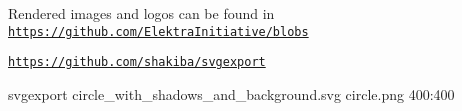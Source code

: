Rendered images and logos can be found in \href{https://github.com/ElektraInitiative/blobs}{\tt https\+://github.\+com/\+Elektra\+Initiative/blobs}

\href{https://github.com/shakiba/svgexport}{\tt https\+://github.\+com/shakiba/svgexport}


\begin{DoxyCode}
svgexport circle\_with\_shadows\_and\_background.svg circle.png 400:400
\end{DoxyCode}
 